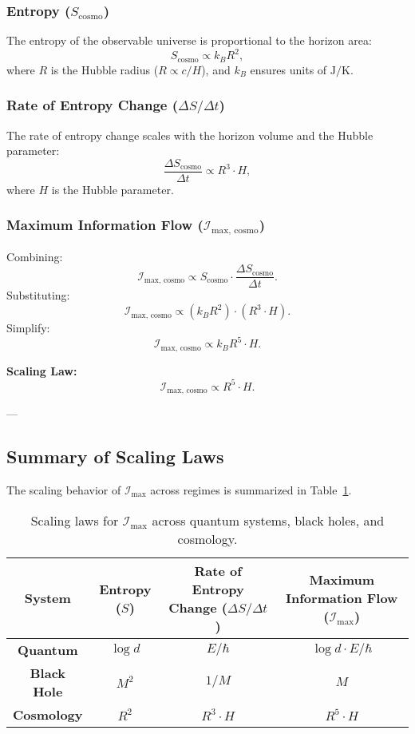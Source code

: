 \documentclass[12pt]{article}
\begin{document}
\subsubsection{Entropy (\( S_{\text{cosmo}} \))}
The entropy of the observable universe is proportional to the horizon area:
\[
S_{\text{cosmo}} \propto k_B R^2,
\]
where \( R \) is the Hubble radius (\( R \propto c / H \)), and \( k_B \) ensures units of \( \text{J/K} \).

\subsubsection{Rate of Entropy Change (\( \Delta S / \Delta t \))}
The rate of entropy change scales with the horizon volume and the Hubble parameter:
\[
\frac{\Delta S_{\text{cosmo}}}{\Delta t} \propto R^3 \cdot H,
\]
where \( H \) is the Hubble parameter.

\subsubsection{Maximum Information Flow (\( \mathcal{I}_{\text{max, cosmo}} \))}
Combining:
\[
\mathcal{I}_{\text{max, cosmo}} \propto S_{\text{cosmo}} \cdot \frac{\Delta S_{\text{cosmo}}}{\Delta t}.
\]
Substituting:
\[
\mathcal{I}_{\text{max, cosmo}} \propto (k_B R^2) \cdot (R^3 \cdot H).
\]
Simplify:
\[
\mathcal{I}_{\text{max, cosmo}} \propto k_B R^5 \cdot H.
\]

\textbf{Scaling Law:}
\[
\mathcal{I}_{\text{max, cosmo}} \propto R^5 \cdot H.
\]

---

\subsection{Summary of Scaling Laws}
The scaling behavior of \( \mathcal{I}_{\text{max}} \) across regimes is summarized in Table~\ref{tab:scaling_laws}.

\begin{table}[h!]
\centering
\begin{tabular}{|c|c|c|c|}
\hline
\textbf{System} & \textbf{Entropy (\( S \))} & \textbf{Rate of Entropy Change (\( \Delta S / \Delta t \))} & \textbf{Maximum Information Flow (\( \mathcal{I}_{\text{max}} \))} \\
\hline
\textbf{Quantum} & \( \log d \) & \( E / \hbar \) & \( \log d \cdot E / \hbar \) \\
\hline
\textbf{Black Hole} & \( M^2 \) & \( 1 / M \) & \( M \) \\
\hline
\textbf{Cosmology} & \( R^2 \) & \( R^3 \cdot H \) & \( R^5 \cdot H \) \\
\hline
\end{tabular}
\caption{Scaling laws for \( \mathcal{I}_{\text{max}} \) across quantum systems, black holes, and cosmology.}
\label{tab:scaling_laws}
\end{table}
\end{document}
